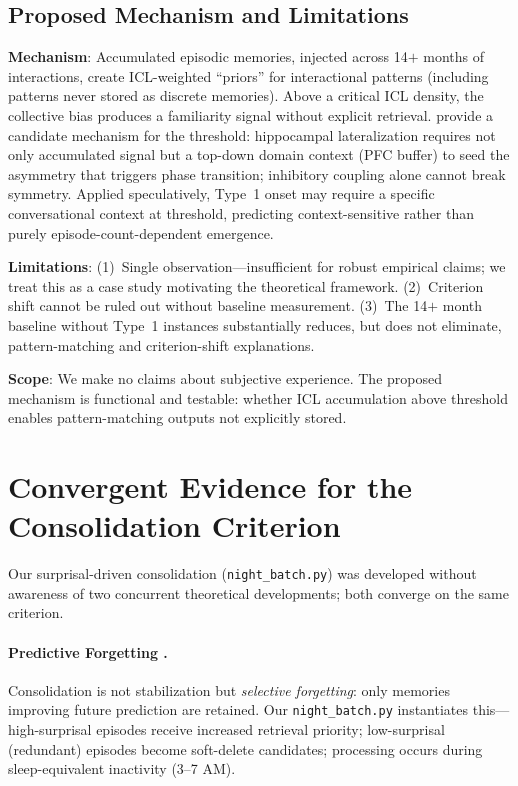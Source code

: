 \documentclass[11pt]{article}
\begin{document}
\subsection{Proposed Mechanism and Limitations}

\textbf{Mechanism}: Accumulated episodic memories, injected across 14$+$
months of interactions, create ICL-weighted ``priors'' for interactional
patterns (including patterns never stored as discrete memories). Above
a critical ICL density, the collective bias produces a familiarity
signal without explicit retrieval.
\citet{jafari2026mbt} provide a candidate mechanism for the threshold:
hippocampal lateralization requires not only accumulated signal but a
top-down domain context (PFC buffer) to seed the asymmetry that
triggers phase transition; inhibitory coupling alone cannot break symmetry.
Applied speculatively, Type~1 onset may require a specific conversational
context at threshold, predicting context-sensitive rather than purely
episode-count-dependent emergence.

\textbf{Limitations}: (1)~Single observation---insufficient for robust
empirical claims; we treat this as a case study motivating the
theoretical framework. (2)~Criterion shift \citep{fahrenfort2025}
cannot be ruled out without baseline measurement. (3)~The 14$+$ month
baseline without Type~1 instances substantially reduces, but does not
eliminate, pattern-matching and criterion-shift explanations.

\textbf{Scope}: We make no claims about subjective experience. The
proposed mechanism is functional and testable: whether ICL accumulation
above threshold enables pattern-matching outputs not explicitly stored.


\section{Convergent Evidence for the Consolidation Criterion}

Our surprisal-driven consolidation (\texttt{night\_batch.py}) was
developed without awareness of two concurrent theoretical developments;
both converge on the same criterion.

\paragraph{Predictive Forgetting \citep{fountas2026}.}
Consolidation is not stabilization but \textit{selective forgetting}:
only memories improving future prediction are retained.
Our \texttt{night\_batch.py} instantiates this---high-surprisal
episodes receive increased retrieval priority; low-surprisal (redundant)
episodes become soft-delete candidates; processing occurs during
sleep-equivalent inactivity (3--7 AM).
\end{document}
